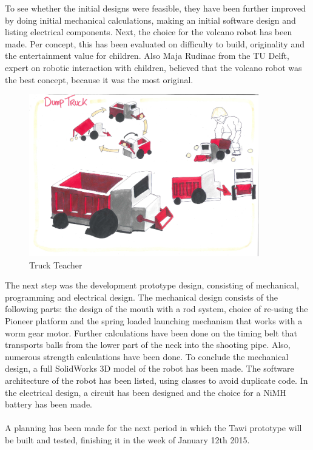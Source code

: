 \documentclass[11pt,twoside,a4paper]{report}
\begin{document}
To see whether the initial designs were feasible, they have been further improved by doing initial mechanical calculations, making an initial software design and listing electrical components. Next, the choice for the volcano robot has been made. Per concept, this has been evaluated on difficulty to build, originality and the entertainment value for children. Also Maja Rudinac from the TU Delft, expert on robotic interaction with children, believed that the volcano robot was the best concept, because it was the most original.
\begin{figure}[H]
\begin{center}
\includegraphics[width=10cm]{Images/TruckTeacherConcept.pdf}
\caption{Truck Teacher}
\label{figure:truckteacherSum}
\end{center}
\end{figure}

The next step was the development prototype design, consisting of mechanical, programming and electrical design. The mechanical design consists of the following parts: the design of the mouth with a rod system, choice of re-using the Pioneer platform and the spring loaded launching mechanism that works with a worm gear motor. Further calculations have been done on the timing belt that transports balls from the lower part of the neck into the shooting pipe. Also, numerous strength calculations have been done. To conclude the mechanical design, a full SolidWorks 3D model of the robot has been made. The software architecture of the robot has been listed, using classes to avoid duplicate code. In the electrical design, a circuit has been designed and the choice for a NiMH battery has been made.  \\
 \\
A planning has been made for the next period in which the Tawi prototype will be built and tested, finishing it in the week of January 12th 2015.
\end{document}
